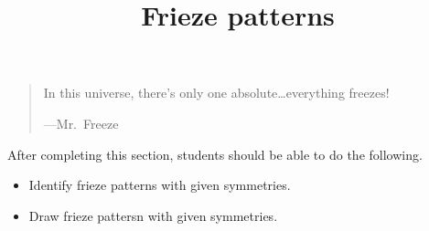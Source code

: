 \documentclass{ximera}
\title{Frieze patterns}
\begin{document}
\begin{abstract}
\end{abstract}
\maketitle

\begin{quote}
In this universe, there's only one absolute\dots everything freezes!

\hfill---Mr.\ Freeze
\end{quote}

After completing this section, students should be able to do the following.

\begin{itemize}
\item Identify frieze patterns with given symmetries.
\item Draw frieze pattersn with given symmetries.
\end{itemize}
\end{document}
